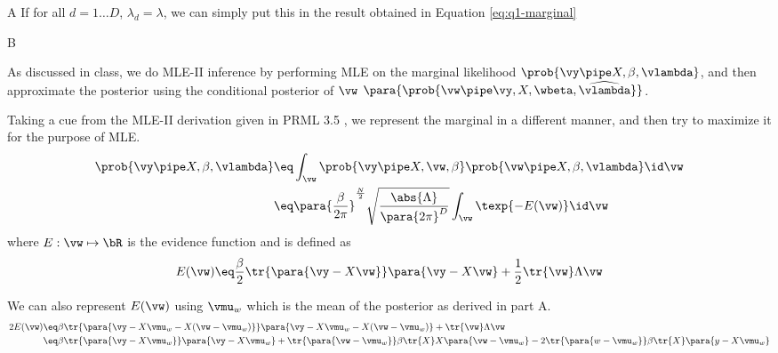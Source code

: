 \documentclass{article}
\begin{document}
\begin{question}
\begin{qpart}{A}
		If for all $d = 1 \dots D$, $\lambda_d = \lambda$, we can simply put this in the result obtained in Equation \ref{eq:q1-marginal}

	\end{qpart}

	\begin{qpart}{B}

		As discussed in class, we do MLE-II inference by performing MLE on the marginal likelihood $\prob{\vy \pipe X, \beta, \vlambda}$, and then approximate the posterior using the conditional posterior of $\vw$ $\para{\prob{\vw \pipe \vy, X, \wbeta, \widehat{\vlambda}}}$.
		\br


		Taking a cue from the MLE-II derivation given in PRML 3.5 \cite{prml}, we represent the marginal in a different manner, and then try to maximize it for the purpose of MLE.
		\begin{align*}
			\prob{\vy \pipe X, \beta, \vlambda}	&\eq	\int_{\vw} \prob{\vy \pipe X, \vw, \beta} \prob{\vw \pipe X, \beta, \vlambda} \id \vw \\
			&\eq	\para{\frac{\beta}{2\pi}}^{\frac{N}{2}} \sqrt{\frac{\abs{\Lambda}}{\para{2 \pi}^D}} \int_{\vw} \texp{- E(\vw)} \id \vw
		\end{align*}
		where $E : \vw \mapsto \bR$ is the evidence function \cite{prml} and is defined as
		\begin{align*}
			E(\vw)	\eq	\frac{\beta}{2} \tr{\para{\vy - X \vw}} \para{\vy - X \vw} + \frac{1}{2} \tr{\vw} \Lambda \vw
		\end{align*}

		We can also represent $E(\vw)$ using $\vmu_w$ which is the mean of the posterior as derived in part A.
		\begin{align*}
			2 E(\vw)	&\eq	\beta \tr{\para{\vy - X \vmu_w - X (\vw - \vmu_w)}} \para{\vy - X \vmu_w - X (\vw - \vmu_w)} + \tr{\vw} \Lambda \vw \\
			&\eq	\beta \tr{\para{\vy - X \vmu_w}} \para{\vy - X \vmu_w}  + \tr{\para{\vw - \vmu_w}} \beta \tr{X} X \para{\vw - \vmu_w} - 2 \tr{\para{w - \vmu_w}} \beta \tr{X} \para{y - X \vmu_w}
		\end{align*}


\end{qpart}
\end{question}
\end{document}
